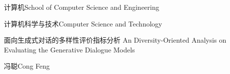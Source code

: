 
\school
{计算机}{School of Computer Science and Engineering}

\major
{计算机科学与技术}{Computer Science and Technology}

\thesistitle
{面向生成式对话的多样性评价指标分析}
{}
{An Diversity-Oriented Analysis on Evaluating the Generative Dialogue Models}
{}

\thesisauthor
{冯聪}{Cong Feng}










